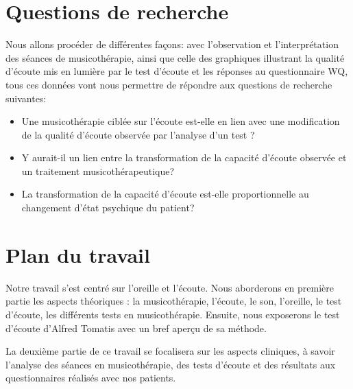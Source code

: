 \section* {Questions de recherche}


Nous allons procéder de différentes façons:  avec l'observation et l'interprétation  des séances de 
musicothérapie, ainsi que celle des graphiques illustrant la qualité d'écoute mis en lumière par le test 
d'écoute
et les réponses au 
questionnaire WQ, tous ces données 
vont nous permettre de 
répondre aux questions de recherche suivantes: 

\begin{itemize}
\item Une musicothérapie ciblée sur l'écoute  est-elle en lien avec une modification de la qualité d'écoute 
observée par  l'analyse d'un test ?
        \item Y aurait-il un lien entre la transformation de la capacité d'écoute observée  et un traitement 
        musicothérapeutique?
  \item La transformation de la capacité d'écoute est-elle  proportionnelle au changement 
  d'état psychique du patient?
   \end{itemize}




\section*{Plan du travail}
Notre travail s'est centré sur l'oreille et l'écoute.
Nous aborderons en première partie les aspects théoriques : la musicothérapie, l'écoute, le son, l'oreille, 
le
test d'écoute, les différents tests en musicothérapie. Ensuite, nous
exposerons le test d'écoute d'Alfred Tomatis avec un bref aperçu de sa méthode.

La deuxième partie de ce travail se focalisera sur les aspects
cliniques, à savoir l'analyse des séances en  musicothérapie,  des tests d'écoute et des résultats aux 
questionnaires  réalisés  avec  nos patients.

